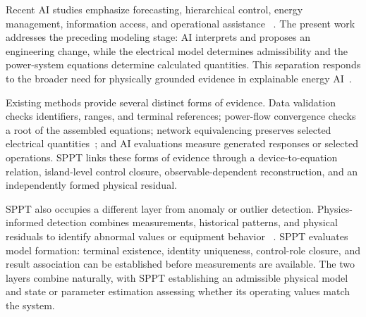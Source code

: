 \documentclass[final,5p,times,twocolumn]{elsarticle}
\begin{document}
Recent AI studies emphasize forecasting, hierarchical control, energy
management, information access, and operational assistance
~\cite{gutierrez2024ai,madani2025llm}. The present work addresses the preceding
modeling stage: AI interprets and proposes an engineering change, while the
electrical model determines admissibility and the power-system equations
determine calculated quantities. This separation responds to the broader need
for physically grounded evidence in explainable energy AI~\cite{liao2024xai}.

Existing methods provide several distinct forms of evidence. Data validation
checks identifiers, ranges, and terminal references; power-flow convergence
checks a root of the assembled equations; network equivalencing preserves
selected electrical quantities~\cite{dorfler2013kron}; and AI evaluations
measure generated responses or selected operations. SPPT links these forms of
evidence through a device-to-equation relation, island-level control closure,
observable-dependent reconstruction, and an independently formed physical
residual.

SPPT also occupies a different layer from anomaly or outlier detection.
Physics-informed detection combines measurements, historical patterns, and
physical residuals to identify abnormal values or equipment behavior
~\cite{wu2024piml,guato2024anomaly}. SPPT evaluates model formation: terminal
existence, identity uniqueness, control-role closure, and result association can
be established before measurements are available. The two layers combine
naturally, with SPPT establishing an admissible physical model and state or
parameter estimation assessing whether its operating values match the system.
\end{document}
